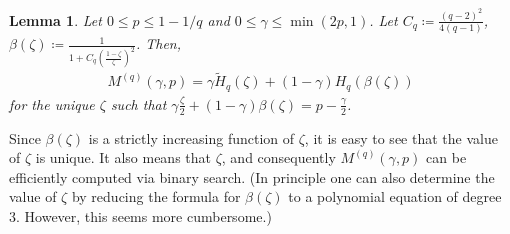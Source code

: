 \documentclass{article}
\theoremstyle{plain}
\theoremstyle{plain}
\theoremstyle{plain}
\theoremstyle{plain}
\theoremstyle{plain}
\theoremstyle{plain}
\theoremstyle{plain}
\newtheorem{lemma}[definition]{Lemma}%
\theoremstyle{plain}
\theoremstyle{plain}
\theoremstyle{plain}
\theoremstyle{remark}
\theoremstyle{remark}
\theoremstyle{remark}
\theoremstyle{plain}
\begin{document}
\begin{lemma}
\label{lem:almost-closed-form}
Let $0\le p\le 1-1/q$ and $0\le\gamma\le\min(2p,1)$.
Let $C_q\coloneqq\frac{(q-2)^2}{4(q-1)}$,
$\beta(\zeta)\coloneqq\frac{1}{1+C_q(\frac{1-\zeta}{\zeta})^2}$.
Then,
        \begin{align*}
            M^{(q)}(\gamma,p)=\gamma\tilde{H}_q(\zeta)+(1-\gamma)H_q(\beta(\zeta))
        \end{align*}
        for the unique $\zeta$ such that $\gamma\frac{\zeta}{2}+(1-\gamma)\beta(\zeta)=p-\frac{\gamma}{2}$.
\end{lemma}

Since $\beta(\zeta)$ is a strictly increasing
function of $\zeta$, it is easy to see that the
value of $\zeta$ is unique. It also means that
$\zeta$, and consequently $M^{(q)}(\gamma,p)$
can be efficiently computed via binary search.
(In principle one can also determine the value
of $\zeta$ by reducing the formula
for $\beta(\zeta)$ to a polynomial equation
of degree 3. However, this seems more cumbersome.)
\end{document}
